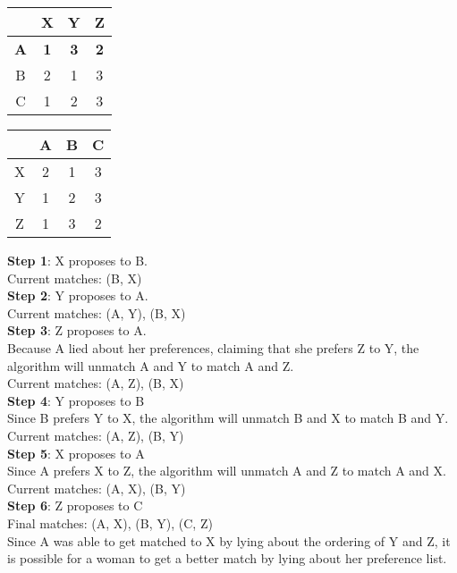 \documentclass[oneside, 12pt]{article}
\begin{document}
\begin{enumerate}
\begin{table}[htb]
\centering
\begin{tabular}{c | c c c}
& X & Y & Z \\
\hline
\textbf{A} & \textbf{1} & \textbf{3} & \textbf{2}\\
B & 2 & 1 & 3\\
C & 1 & 2 & 3\\
\end{tabular}
\qquad
\begin{tabular}{c | c c c}
& A & B & C\\
\hline
X & 2 & 1 & 3\\
Y & 1 & 2 & 3\\
Z & 1 & 3 & 2\\
\end{tabular}
\end{table}
\newline
\textbf{Step 1}: X proposes to B.\\
Current matches: (B, X)\\
\textbf{Step 2}: Y proposes to A.\\
Current matches: (A, Y), (B, X)\\
\textbf{Step 3}: Z proposes to A.\\
Because A lied about her preferences, claiming that she prefers Z to Y, the algorithm will unmatch A and Y to match A and Z.\\
Current matches: (A, Z), (B, X)\\
\textbf{Step 4}: Y proposes to B\\
Since B prefers Y to X, the algorithm will unmatch B and X to match B and Y.\\
Current matches: (A, Z), (B, Y)\\
\textbf{Step 5}: X proposes to A\\
Since A prefers X to Z, the algorithm will unmatch A and Z to match A and X.\\
Current matches: (A, X), (B, Y)\\
\textbf{Step 6}: Z proposes to C\\
Final matches: (A, X), (B, Y), (C, Z)\\
\newline
Since A was able to get matched to X by lying about the ordering of Y and Z, it is possible for a woman to get a better match by lying about her preference list.
\end{enumerate}
\clearpage
\end{document}
